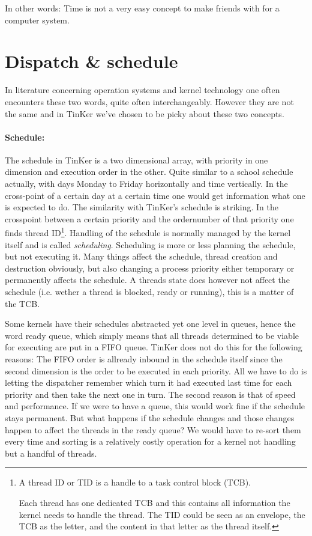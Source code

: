 		In other words: Time is not a very easy concept to make friends with for a computer system.


		\section{Dispatch \& schedule}
		In literature concerning operation systems and kernel technology one often encounters these two words, quite often interchangeably. However they are not the same and in TinKer we've chosen to be picky about these two concepts.

		\paragraph{Schedule:} The schedule in TinKer is a two dimensional array, with priority in one dimension and execution order in the other. Quite similar to a school schedule actually, with days Monday to Friday horizontally and time vertically. In the cross-point of a certain day at a certain time one would get information what one is expected to do. The similarity with TinKer's schedule is striking. In the crosspoint between a certain priority and the ordernumber of that priority one finds thread ID\footnote{A thread ID or TID is a handle to a task control block (TCB). 

		Each thread has one dedicated TCB and this  contains all information the kernel needs to handle the thread. The TID could be seen as an envelope, the TCB as the letter, and the content in that letter as the thread itself.}. Handling of the schedule is normally managed by the kernel itself and is called \textit{scheduling}. Scheduling is more or less planning the schedule, but not executing it. Many things affect the schedule, thread creation and destruction obviously, but also changing a process priority either temporary or permanently affects the schedule. A threads state does however not affect the schedule (i.e. wether a thread is blocked, ready or running), this is a matter of the TCB. 

		Some kernels have their schedules abstracted yet one level in queues, hence the word ready queue, which simply means that all threads determined to be viable for executing are put in a FIFO queue. TinKer does not do this for the following reasons: The FIFO order is allready inbound in the schedule itself since the second dimension is the order to be executed in each priority. All we have to do is letting the dispatcher remember which turn it had executed last time for each priority and then take the next one in turn. The second reason is that of speed and performance. If we were to have a queue, this would work fine if the schedule stays permanent. But what happens if the schedule changes and those changes happen to affect the threads in the ready queue? We would have to re-sort them every time and sorting is a relatively costly operation for a kernel not handling but a handful of threads.

